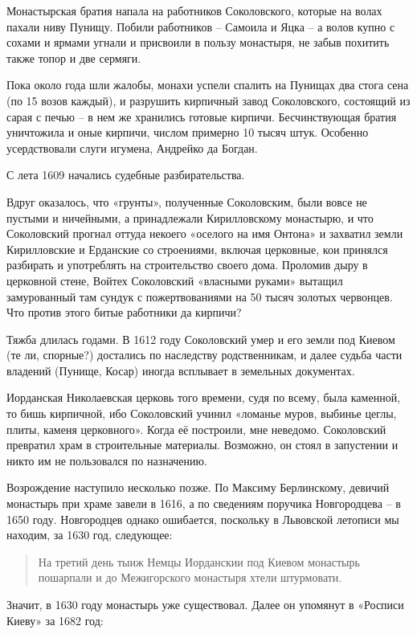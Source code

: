 Монастырская братия напала на работников Соколовского, которые на волах пахали ниву Пунищу. Побили работников – Самоила и Яцка – а волов купно с сохами и ярмами угнали и присвоили в пользу монастыря, не забыв похитить также топор и две сермяги. 

Пока около года шли жалобы, монахи успели спалить на Пунищах два стога сена (по 15 возов каждый), и разрушить кирпичный завод Соколовского, состоящий из сарая с печью – в нем же хранились готовые кирпичи. Бесчинствующая братия уничтожила и оные кирпичи, числом примерно 10 тысяч штук. Особенно усердствовали слуги игумена, Андрейко да Богдан.

С лета 1609 начались судебные разбирательства.

Вдруг оказалось, что «грунты», полученные Соколовским, были вовсе не пустыми и ничейными, а принадлежали Кирилловскому монастырю, и что Соколовский прогнал оттуда некоего «оселого на имя Онтона» и захватил земли Кирилловские и Ерданские со строениями, включая церковные, кои принялся разбирать и употреблять на строительство своего дома. Проломив дыру в церковной стене, Войтех Соколовский «власными руками» вытащил замурованный там сундук с пожертвованиями на 50 тысяч золотых червонцев. Что против этого битые работники да кирпичи?

Тяжба длилась годами. В 1612 году Соколовский умер и его земли под Киевом (те ли, спорные?) достались по наследству родственникам, и далее судьба части владений (Пунище, Косар) иногда всплывает в земельных документах.

Иорданская Николаевская церковь того времени, судя по всему, была каменной, то бишь кирпичной, ибо Соколовский учинил «ломанье муров, выбинье цеглы, плиты, каменя церковного». Когда её построили, мне неведомо. Соколовский превратил храм в строительные материалы. Возможно, он стоял в запустении и никто им не пользовался по назначению.

Возрождение наступило несколько позже. По Максиму Берлинскому, девичий монастырь при храме завели в 1616, а по сведениям поручика Новгородцева – в 1650 году. Новгородцев однако ошибается, поскольку в Львовской летописи мы находим, за 1630 год, следующее:

\begin{quotation}
На третий день тыиж Немцы Иорданскии под Киевом монастырь пошарпали и до Межигорского монастыря хтели штурмовати.
\end{quotation}

Значит, в 1630 году монастырь уже существовал. Далее он упомянут в «Росписи Киеву» за 1682 год:

